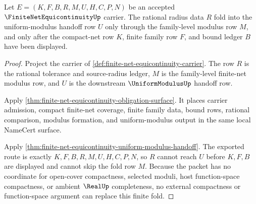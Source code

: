 \begin{theorem}
\label{thm:finite-net-equicontinuity-rational-radius-folding}
Let $E=(K,F,B,R,M,U,H,C,P,N)$ be an accepted $\FiniteNetEquicontinuityUp$ carrier. The rational radius data $R$ fold into the uniform-modulus handoff row $U$ only through the family-level modulus row $M$, and only after the compact-net row $K$, finite family row $F$, and bound ledger $B$ have been displayed.
\end{theorem}
\begin{proof}
Project the carrier of \autoref{def:finite-net-equicontinuity-carrier}. The row $R$ is the rational tolerance and source-radius ledger, $M$ is the family-level finite-net modulus row, and $U$ is the downstream $\UniformModulusUp$ handoff row.

Apply \autoref{thm:finite-net-equicontinuity-obligation-surface}. It places carrier admission, compact finite-net coverage, finite family data, bound rows, rational comparison, modulus formation, and uniform-modulus output in the same local NameCert surface.

Apply \autoref{thm:finite-net-equicontinuity-uniform-modulus-handoff}. The exported route is exactly $K,F,B,R,M,U,H,C,P,N$, so $R$ cannot reach $U$ before $K,F,B$ are displayed and cannot skip the fold row $M$. Because the packet has no coordinate for open-cover compactness, selected moduli, host function-space compactness, or ambient $\RealUp$ completeness, no external compactness or function-space argument can replace this finite fold.
\end{proof}

\begin{closurestatus}{\FiniteNetEquicontinuityUp}
  \theoryclosure{\seedClosure}
  \formalstatus{\unformalizedV}
\end{closurestatus}
